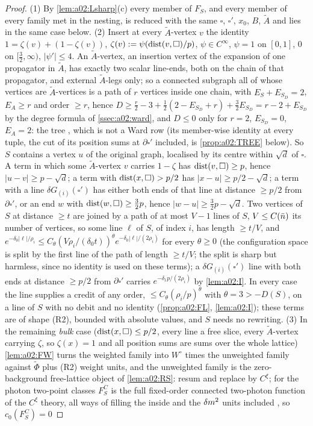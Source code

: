 \begin{proof}
(1) By \cref{lem:a02:Lsharp}(c) every member of $F_S$, and every member of every family met in the nesting, is reduced with the same $\square$, $\square'$, $x_0$, $B$, $\tilde A$ and lies in the same case below. (2) Insert at every $\tilde A$-vertex $v$ the identity $1=\zeta(v)+(1-\zeta(v))$, $\zeta(v):=\psi(\operatorname{dist}(v,\square)/p)$, $\psi\in C^\infty$, $\psi=1$ on $[0,1]$, $0$ on $[\frac32,\infty)$, $|\psi'|\le4$. An $\tilde A$-vertex, an insertion vertex of the expansion \cite[(3.52)--(3.53)]{K1} of one propagator in $\tilde A$, has exactly two scalar line-ends, both on the chain of that propagator, and external $\tilde A$-legs only; so a connected subgraph all of whose vertices are $\tilde A$-vertices is a path of $r$ vertices inside one chain, with $E_S+E_{S_D}=2$, $E_A\ge r$ and order $\ge r$, hence $D\ge\frac r2-3+\frac12(2-E_{S_D}+r)+\frac32E_{S_D}=r-2+E_{S_D}$ by the degree formula of \cref{ssec:a02:ward}, and $D\le0$ only for $r=2$, $E_{S_D}=0$, $E_A=2$: the tree \cite[(2.4)]{Ba3}, which is not a Ward row (its member-wise identity at every tuple, the cut of its position sums at $\partial\square'$ included, is \cref{prop:a02:TREE} below). So $S$ contains a vertex $u$ of the original graph, localised by its centre within $\sqrt d$ of $\square$. A term in which some $\tilde A$-vertex $v$ carries $1-\zeta$ has $\operatorname{dist}(v,\square)\ge p$, hence $|u-v|\ge p-\sqrt d$; a term with $\operatorname{dist}(x,\square)>p/2$ has $|x-u|\ge p/2-\sqrt d$; a term with a line $\delta G_{(i)}(\square')$ has either both ends of that line at distance $\ge p/2$ from $\partial\square'$, or an end $w$ with $\operatorname{dist}(w,\square)\ge\frac32p$, hence $|w-u|\ge\frac32p-\sqrt d$. Two vertices of $S$ at distance $\ge t$ are joined by a path of at most $V-1$ lines of $S$, $V\le C(\bar n)$ its number of vertices, so some line $\ell$ of $S$, of index $i$, has length $\ge t/V$, and $e^{-\delta_0|\ell|/\rho_i}\le C_\theta(V\rho_i/(\delta_0t))^\theta e^{-\delta_0|\ell|/(2\rho_i)}$ for every $\theta\ge0$ (the configuration space is split by the first line of the path of length $\ge t/V$; the split is sharp but harmless, since no identity is used on these terms); a $\delta G_{(i)}(\square')$ line with both ends at distance $\ge p/2$ from $\partial\square'$ carries $e^{-\delta_1p/(2\rho_i)}$ by \cref{lem:a02:I}. In every case the line supplies a credit of any order, $\le C_\theta(\rho_i/p)^\theta$ with $\theta=3>-D(S)$, on a line of $S$ with no debit and no identity (\cref{prop:a02:FL}, \cref{lem:a02:I}); these terms are of shape (R2), bounded with absolute values, and $S$ needs no rewriting. (3) In the remaining \emph{bulk} case ($\operatorname{dist}(x,\square)\le p/2$, every line a free slice, every $\tilde A$-vertex carrying $\zeta$, so $\zeta(x)=1$ and all position sums are sums over the whole lattice) \cref{lem:a02:FW} turns the weighted family into $W^\circ$ times the unweighted family against $\tilde\Phi$ plus (R2) weight units, and the unweighted family is the zero-background free-lattice object of \cref{lem:a02:RS}: resum and replace by $C^\xi$; for the photon two-point classes $F^C_S$ is the full fixed-order connected two-photon function of the $C^\xi$ theory, all ways of filling the inside and the $\delta m^2$ units included \cite[p.~431]{Ba3}, so $c_0(F^C_S)=0$ 
\end{proof}
